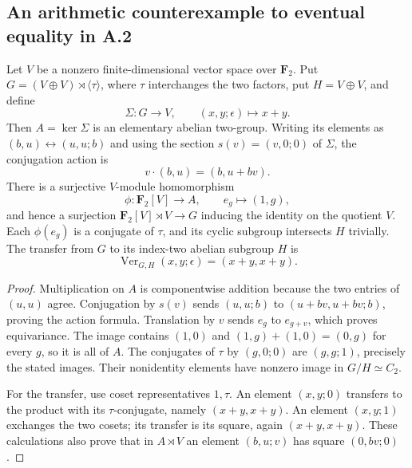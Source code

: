 \subsection{An arithmetic counterexample to eventual equality in A.2}

\begin{lemma}
\label{A:A2-wreath-calculation}
Let $V$ be a nonzero finite-dimensional vector space over $\mathbf F_2$.
Put $G=(V\oplus V)\rtimes\langle\tau\rangle$, where $\tau$ interchanges
the two factors, put $H=V\oplus V$, and define
\[
 \Sigma:G\longrightarrow V,\qquad (x,y;\epsilon)\longmapsto x+y.
\]
Then $A=\ker\Sigma$ is an elementary abelian two-group. Writing its
elements as $(b,u)\leftrightarrow(u,u;b)$ and using the section
$s(v)=(v,0;0)$ of $\Sigma$, the conjugation action is
\[
                 v\cdot(b,u)=(b,u+bv).
\]
There is a surjective $V$-module homomorphism
\[
 \phi:\mathbf F_2[V]\longrightarrow A,
 \qquad e_g\longmapsto(1,g),
\]
and hence a surjection $\mathbf F_2[V]\rtimes V\to G$ inducing the
identity on the quotient $V$. Each $\phi(e_g)$ is a conjugate of
$\tau$, and its cyclic subgroup intersects $H$ trivially.
The transfer from $G$ to its index-two abelian subgroup $H$ is
\[
             \operatorname{Ver}_{G,H}(x,y;\epsilon)
                    =(x+y,x+y).
\]
\end{lemma}
\begin{proof}
Multiplication on $A$ is componentwise addition because the two entries
of $(u,u)$ agree. Conjugation by $s(v)$ sends $(u,u;b)$ to
$(u+bv,u+bv;b)$, proving the action formula. Translation by $v$ sends
$e_g$ to $e_{g+v}$, which proves equivariance. The image contains
$(1,0)$ and $(1,g)+(1,0)=(0,g)$ for every $g$, so it is all of $A$.
The conjugates of $\tau$ by $(g,0;0)$ are $(g,g;1)$, precisely the
stated images. Their nonidentity elements have nonzero image in
$G/H\simeq C_2$.

For the transfer, use coset representatives $1,\tau$. An element
$(x,y;0)$ transfers to the product with its $\tau$-conjugate,
namely $(x+y,x+y)$. An element $(x,y;1)$ exchanges the two cosets;
its transfer is its square, again $(x+y,x+y)$. These calculations
also prove that in $A\rtimes V$ an element $(b,u;v)$ has square
$(0,bv;0)$.
\end{proof}

